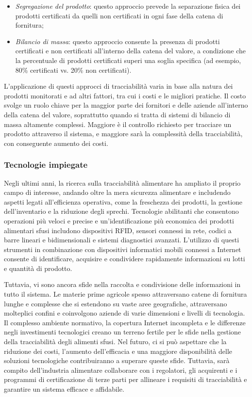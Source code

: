 \begin{itemize}
    \item \textit{Segregazione del prodotto}: questo approccio prevede la separazione fisica dei prodotti certificati da quelli non certificati in ogni fase della catena di fornitura;
    \item \textit{Bilancio di massa}: questo approccio consente la presenza di prodotti certificati e non certificati all'interno della catena del valore, a condizione che la percentuale di prodotti certificati superi una soglia specifica (ad esempio, 80\% certificati vs. 20\% non certificati).
   
\end{itemize}

L'applicazione di questi approcci di tracciabilità varia in base alla natura dei prodotti monitorati e ad altri fattori, tra cui i costi e le migliori pratiche. Il costo svolge un ruolo chiave per la maggior parte dei fornitori e delle aziende all'interno della catena del valore, soprattutto quando si tratta di sistemi di bilancio di massa altamente complessi. Maggiore è il controllo richiesto per tracciare un prodotto attraverso il sistema, e maggiore sarà la complessità della tracciabilità, con conseguente aumento dei costi.

\subsubsection{Tecnologie impiegate}

Negli ultimi anni, la ricerca sulla tracciabilità alimentare ha ampliato il proprio campo di interesse, andando oltre la mera sicurezza alimentare e includendo aspetti legati all'efficienza operativa, come la freschezza dei prodotti, la gestione dell'inventario e la riduzione degli sprechi. Tecnologie abilitanti che consentono operazioni più veloci e precise e un'identificazione più economica dei prodotti alimentari sfusi includono dispositivi RFID, sensori connessi in rete, codici a barre lineari e bidimensionali e sistemi diagnostici avanzati. L'utilizzo di questi strumenti in combinazione con dispositivi informatici mobili connessi a Internet consente di identificare, acquisire e condividere rapidamente informazioni su lotti e quantità di prodotto.

Tuttavia, vi sono ancora sfide nella raccolta e condivisione delle informazioni in tutto il sistema. Le materie prime agricole spesso attraversano catene di fornitura lunghe e complesse che si estendono su vaste aree geografiche, attraversano molteplici confini e coinvolgono aziende di varie dimensioni e livelli di tecnologia. Il complesso ambiente normativo, la copertura Internet incompleta e le differenze negli investimenti tecnologici creano un terreno fertile per le sfide nella gestione della tracciabilità degli alimenti sfusi. Nel futuro, ci si può aspettare che la riduzione dei costi, l'aumento dell'efficacia e una maggiore disponibilità delle soluzioni tecnologiche contribuiranno a superare queste sfide. Tuttavia, sarà compito dell'industria alimentare collaborare con i regolatori, gli acquirenti e i programmi di certificazione di terze parti per allineare i requisiti di tracciabilità e garantire un sistema efficace e affidabile.


